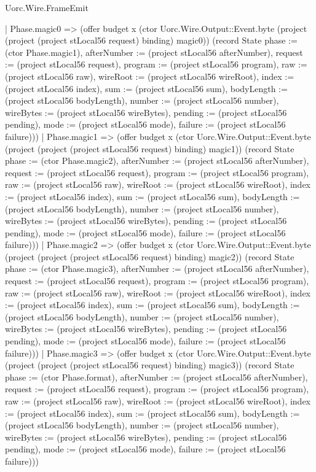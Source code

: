 \begin{lexlean}{Uorc.Wire.FrameEmit}
\begin{semanticmodule}
{        | Phase.magic0 => (offer budget x (ctor Uorc.Wire.Output::Event.byte (project (project (project stLocal56 request) binding) magic0)) (record State {phase := (ctor Phase.magic1), afterNumber := (project stLocal56 afterNumber), request := (project stLocal56 request), program := (project stLocal56 program), raw := (project stLocal56 raw), wireRoot := (project stLocal56 wireRoot), index := (project stLocal56 index), sum := (project stLocal56 sum), bodyLength := (project stLocal56 bodyLength), number := (project stLocal56 number), wireBytes := (project stLocal56 wireBytes), pending := (project stLocal56 pending), mode := (project stLocal56 mode), failure := (project stLocal56 failure)}))
        | Phase.magic1 => (offer budget x (ctor Uorc.Wire.Output::Event.byte (project (project (project stLocal56 request) binding) magic1)) (record State {phase := (ctor Phase.magic2), afterNumber := (project stLocal56 afterNumber), request := (project stLocal56 request), program := (project stLocal56 program), raw := (project stLocal56 raw), wireRoot := (project stLocal56 wireRoot), index := (project stLocal56 index), sum := (project stLocal56 sum), bodyLength := (project stLocal56 bodyLength), number := (project stLocal56 number), wireBytes := (project stLocal56 wireBytes), pending := (project stLocal56 pending), mode := (project stLocal56 mode), failure := (project stLocal56 failure)}))
        | Phase.magic2 => (offer budget x (ctor Uorc.Wire.Output::Event.byte (project (project (project stLocal56 request) binding) magic2)) (record State {phase := (ctor Phase.magic3), afterNumber := (project stLocal56 afterNumber), request := (project stLocal56 request), program := (project stLocal56 program), raw := (project stLocal56 raw), wireRoot := (project stLocal56 wireRoot), index := (project stLocal56 index), sum := (project stLocal56 sum), bodyLength := (project stLocal56 bodyLength), number := (project stLocal56 number), wireBytes := (project stLocal56 wireBytes), pending := (project stLocal56 pending), mode := (project stLocal56 mode), failure := (project stLocal56 failure)}))
        | Phase.magic3 => (offer budget x (ctor Uorc.Wire.Output::Event.byte (project (project (project stLocal56 request) binding) magic3)) (record State {phase := (ctor Phase.format), afterNumber := (project stLocal56 afterNumber), request := (project stLocal56 request), program := (project stLocal56 program), raw := (project stLocal56 raw), wireRoot := (project stLocal56 wireRoot), index := (project stLocal56 index), sum := (project stLocal56 sum), bodyLength := (project stLocal56 bodyLength), number := (project stLocal56 number), wireBytes := (project stLocal56 wireBytes), pending := (project stLocal56 pending), mode := (project stLocal56 mode), failure := (project stLocal56 failure)}))
}
\end{semanticmodule}
\end{lexlean}
